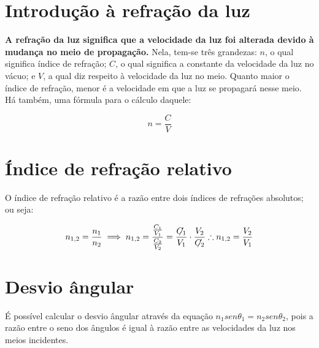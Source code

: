 \documentclass[
	12pt,				
	openright,			
	oneside,			
	a4paper,			
	brazil				
	]{abntex2}
\begin{document}
\frenchspacing
\imprimircapa
\tableofcontents
\newpage


\section[Introdução à refração da luz]{Introdução à refração da luz}
\textbf{A refração da luz significa que a velocidade da luz foi alterada devido à mudança no meio de propagação.} 
Nela, tem-se três grandezas: 
$n$, o qual significa índice de refração; 
$C$, o qual significa a constante da velocidade da luz no vácuo; 
e $V$, a qual diz respeito à velocidade da luz no meio.
Quanto maior o índice de refração, menor é a velocidade em que a luz se propagará nesse meio.
Há também, uma fórmula para o cálculo daquele:

$$
n = \frac{C}{V}
$$

\section[Índice de refração relativo]{Índice de refração relativo}
O índice de refração relativo é a razão entre dois índices de refrações absolutos; ou seja:

$$
n_{1,2} = \frac{n_1}{n_2} \implies n_{1,2} = \frac{\frac{C_1}{V_1}}{\frac{C_2}{V_2}} = \frac{\centernot{C_1}}{V_1}\cdot\frac{V_2}{\centernot{C_2}}
\therefore n_{1,2} = \frac{V_2}{V_1}
$$

\section[Desvio ângular]{Desvio ângular}
É possível calcular o desvio ângular através da equação $n_1 sen\theta_1 = n_2 sen\theta_2$, pois a razão entre o seno dos ângulos é igual à razão
entre as velocidades da luz nos meios incidentes.
\end{document}
